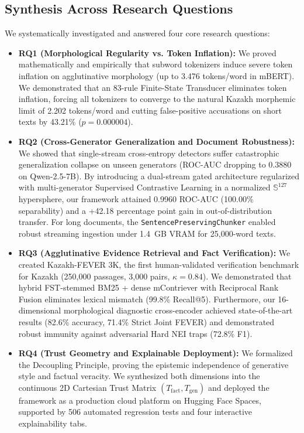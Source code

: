 \subsection{Synthesis Across Research Questions}
We systematically investigated and answered four core research questions:
\begin{itemize}
    \item \textbf{RQ1 (Morphological Regularity vs. Token Inflation):} We proved mathematically and empirically that subword tokenizers induce severe token inflation on agglutinative morphology (up to 3.476 tokens/word in mBERT). We demonstrated that an 83-rule Finite-State Transducer eliminates token inflation, forcing all tokenizers to converge to the natural Kazakh morphemic limit of 2.202 tokens/word and cutting false-positive accusations on short texts by 43.21\% ($p = 0.000004$).
    \item \textbf{RQ2 (Cross-Generator Generalization and Document Robustness):} We showed that single-stream cross-entropy detectors suffer catastrophic generalization collapse on unseen generators (ROC-AUC dropping to 0.3880 on Qwen-2.5-7B). By introducing a dual-stream gated architecture regularized with multi-generator Supervised Contrastive Learning in a normalized $\mathbb{S}^{127}$ hypersphere, our framework attained 0.9960 ROC-AUC (100.00\% separability) and a +42.18 percentage point gain in out-of-distribution transfer. For long documents, the \texttt{SentencePreservingChunker} enabled robust streaming ingestion under 1.4~GB VRAM for 25,000-word texts.
    \item \textbf{RQ3 (Agglutinative Evidence Retrieval and Fact Verification):} We created Kazakh-FEVER 3K, the first human-validated verification benchmark for Kazakh (250,000 passages, 3,000 pairs, $\kappa = 0.84$). We demonstrated that hybrid FST-stemmed BM25 + dense mContriever with Reciprocal Rank Fusion eliminates lexical mismatch (99.8\% Recall@5). Furthermore, our 16-dimensional morphological diagnostic cross-encoder achieved state-of-the-art results (82.6\% accuracy, 71.4\% Strict Joint FEVER) and demonstrated robust immunity against adversarial Hard NEI traps (72.8\% F1).
    \item \textbf{RQ4 (Trust Geometry and Explainable Deployment):} We formalized the Decoupling Principle, proving the epistemic independence of generative style and factual veracity. We synthesized both dimensions into the continuous 2D Cartesian Trust Matrix $(T_{\text{fact}}, T_{\text{gen}})$ and deployed the framework as a production cloud platform on Hugging Face Spaces, supported by 506 automated regression tests and four interactive explainability tabs.
\end{itemize}

